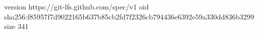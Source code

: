 version https://git-lfs.github.com/spec/v1
oid sha256:f85957f7d9022165b637b85cb2fd7f2326cb794436e6392e59a330dd836b3299
size 341
